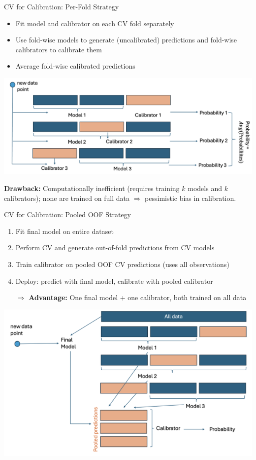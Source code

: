\documentclass[11pt,compress,t,notes=noshow, xcolor=table]{beamer}
\begin{document}
\begin{frame}{CV for Calibration: Per-Fold Strategy}
\begin{itemize}
  \item Fit model and calibrator on each CV fold separately
  \item Use fold-wise models to generate (uncalibrated) predictions and fold-wise calibrators to calibrate them
  \item Average fold-wise calibrated predictions
\end{itemize}

{\centering
\includegraphics[width=0.9\linewidth]{figure_man/CalibWorkflow2.png}}

\pause

\textbf{Drawback:} Computationally inefficient (requires training $k$ models and $k$ calibrators); none are trained on full data $\Rightarrow$ pessimistic bias in calibration.

\end{frame}


\begin{frame}{CV for Calibration: Pooled OOF Strategy}
\begin{enumerate}
  \item Fit final model on entire dataset
  \item Perform CV and generate out-of-fold predictions from CV models
  \item Train calibrator on pooled OOF CV predictions (uses all observations)
  \item Deploy: predict with final model, calibrate with pooled calibrator\\
  \item[$\Rightarrow$] \textbf{Advantage:} One final model + one calibrator, both trained on all data
\end{enumerate}

\vspace{1em}
\centering
\includegraphics[width=0.75\linewidth]{figure_man/CalibWorkflow3.png}

\end{frame}
\end{document}
